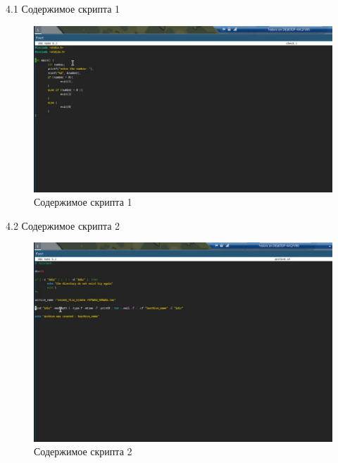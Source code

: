\documentclass[
  ignorenonframetext,
  aspectratio=169,
  russian,
]{beamer}
\begin{document}
\begin{frame}{4.1 Содержимое скрипта 1}
\label{ux441ux43eux434ux435ux440ux436ux438ux43cux43eux435-ux441ux43aux440ux438ux43fux442ux430-1}
\begin{figure}[H]

{\centering \includegraphics[width=0.7\linewidth,height=\textheight,keepaspectratio]{image/content1.png}

}

\caption{Содержимое скрипта 1}

\end{figure}%
\end{frame}

\begin{frame}{4.2 Содержимое скрипта 2}
\label{ux441ux43eux434ux435ux440ux436ux438ux43cux43eux435-ux441ux43aux440ux438ux43fux442ux430-2}
\begin{figure}[H]

{\centering \includegraphics[width=0.7\linewidth,height=\textheight,keepaspectratio]{image/content2.png}

}

\caption{Содержимое скрипта 2}

\end{figure}%
\end{frame}
\end{document}
